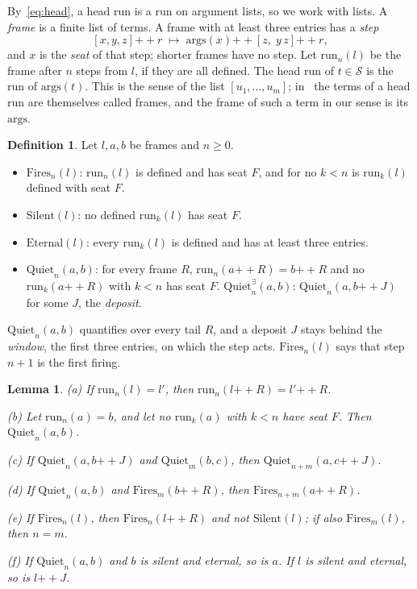 \documentclass[11pt]{amsart}
\newtheorem{lemma}[theorem]{Lemma}
\theoremstyle{definition}
\newtheorem{definition}[theorem]{Definition}
\newcommand{\Ter}{\mathcal S}
\newcommand{\app}{\mathbin{+\!\!+}}
\newcommand{\args}{\mathrm{args}}
\newcommand{\run}{\mathrm{run}}
\newcommand{\Fires}{\mathrm{Fires}}
\newcommand{\Silent}{\mathrm{Silent}}
\newcommand{\Eternal}{\mathrm{Eternal}}
\newcommand{\Quiet}{\mathrm{Quiet}}
\newcommand{\QuietD}{\mathrm{Quiet}^{\exists}}
\begin{document}
By~\eqref{eq:head}, a head run is a run on argument lists, so we work with lists. A \emph{frame}
is a finite list of terms. A frame with at least three entries has a \emph{step}
\[
[x,y,z]\app r\;\mapsto\;\args(x)\app[z,\;y\,z]\app r,
\]
and $x$ is the \emph{seat} of that step; shorter frames have no step. Let $\run_n(l)$ be the frame
after $n$ steps from $l$, if they are all defined. The head run of $t\in\Ter$ is the run of
$\args(t)$. This is the sense of the list $[u_1,\dots,u_m]$; in~\citep{s11} the terms of a head run
are themselves called frames, and the frame of such a term in our sense is its $\args$.

\begin{definition}\label{def:fire}
Let $l,a,b$ be frames and $n\ge0$.
\begin{itemize}
\item $\Fires_n(l)$: $\run_n(l)$ is defined and has seat $F$, and for no $k<n$ is
  $\run_k(l)$ defined with seat $F$.
\item $\Silent(l)$: no defined $\run_k(l)$ has seat $F$.
\item $\Eternal(l)$: every $\run_k(l)$ is defined and has at least three entries.
\item $\Quiet_n(a,b)$: for every frame $R$, $\run_n(a\app R)=b\app R$ and no $\run_k(a\app R)$
  with $k<n$ has seat $F$. $\QuietD_n(a,b)$: $\Quiet_n(a,b\app J)$ for some $J$, the
  \emph{deposit}.
\end{itemize}
\end{definition}

$\Quiet_n(a,b)$ quantifies over every tail $R$, and a deposit $J$ stays behind the
\emph{window}, the first three entries, on which the step acts. $\Fires_n(l)$ says that step $n+1$ is the first firing.

\begin{lemma}\label{lem:frame}
\textup{(a)} If $\run_n(l)=l'$, then $\run_n(l\app R)=l'\app R$.

\textup{(b)} Let $\run_n(a)=b$, and let no $\run_k(a)$ with $k<n$ have seat $F$. Then
$\Quiet_n(a,b)$.

\textup{(c)} If $\Quiet_n(a,b\app J)$ and $\Quiet_m(b,c)$, then $\Quiet_{n+m}(a,c\app J)$.

\textup{(d)} If $\Quiet_n(a,b)$ and $\Fires_m(b\app R)$, then $\Fires_{n+m}(a\app R)$.

\textup{(e)} If $\Fires_n(l)$, then $\Fires_n(l\app R)$ and not $\Silent(l)$; if also
$\Fires_m(l)$, then $n=m$.

\textup{(f)} If $\Quiet_n(a,b)$ and $b$ is silent and eternal, so is $a$. If $l$ is silent and
eternal, so is $l\app J$.
\end{lemma}
\end{document}
